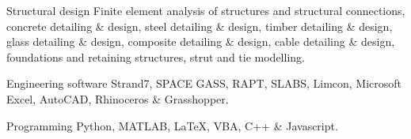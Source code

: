 

\begin{cvskills}

  \cvskill
    {Structural design} %
    {Finite element analysis of structures and structural connections, concrete detailing \& design, steel detailing \newline \& design, timber detailing \& design, glass detailing \& design, composite detailing \& design, cable detailing \& \newline design, foundations and retaining structures, strut and tie modelling.} %

  \cvskill
    {Engineering software} %
    {Strand7, SPACE GASS, RAPT, SLABS, Limcon, Microsoft Excel, AutoCAD, Rhinoceros \& Grasshopper.} %

  \cvskill
    {Programming} %
    {Python, MATLAB, \LaTeX, VBA, C++ \& Javascript.} %

\end{cvskills}
